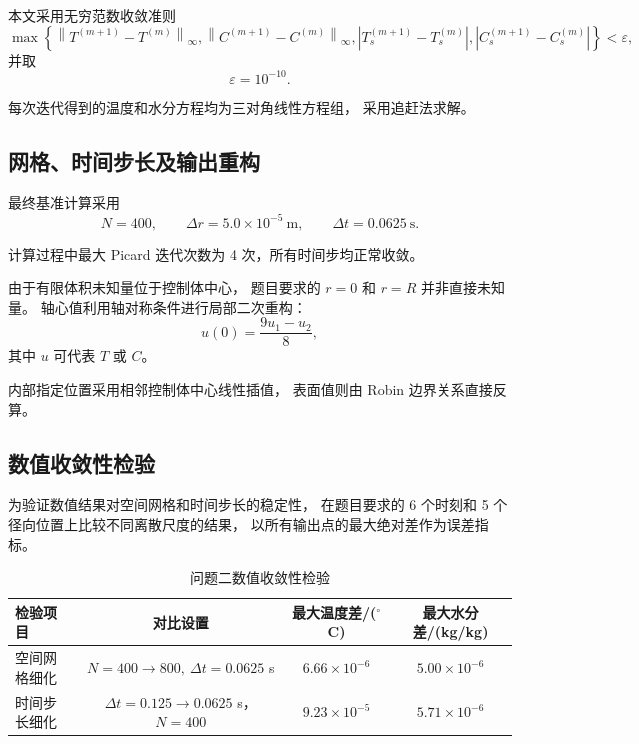 \documentclass[UTF8,a4paper,12pt]{ctexart}
\begin{document}
本文采用无穷范数收敛准则
\begin{equation}
\max
\left\{
\left\|T^{(m+1)}-T^{(m)}\right\|_{\infty},
\left\|C^{(m+1)}-C^{(m)}\right\|_{\infty},
|T_s^{(m+1)}-T_s^{(m)}|,
|C_s^{(m+1)}-C_s^{(m)}|
\right\}
<\varepsilon,
\end{equation}
并取
\begin{equation}
\varepsilon=10^{-10}.
\end{equation}

每次迭代得到的温度和水分方程均为三对角线性方程组，
采用追赶法求解。

\subsection{网格、时间步长及输出重构}

最终基准计算采用
\begin{equation}
N=400,\qquad
\Delta r=5.0\times10^{-5}~\mathrm{m},
\qquad
\Delta t=0.0625~\mathrm{s}.
\end{equation}

计算过程中最大 Picard 迭代次数为 4 次，所有时间步均正常收敛。

由于有限体积未知量位于控制体中心，
题目要求的 $r=0$ 和 $r=R$ 并非直接未知量。
轴心值利用轴对称条件进行局部二次重构：
\begin{equation}
u(0)
=
\frac{9u_1-u_2}{8},
\end{equation}
其中 $u$ 可代表 $T$ 或 $C$。

内部指定位置采用相邻控制体中心线性插值，
表面值则由 Robin 边界关系直接反算。

\subsection{数值收敛性检验}

为验证数值结果对空间网格和时间步长的稳定性，
在题目要求的 6 个时刻和 5 个径向位置上比较不同离散尺度的结果，
以所有输出点的最大绝对差作为误差指标。

\begin{table}[H]
\centering
\caption{问题二数值收敛性检验}
\begin{tabular}{lccc}
\toprule
检验项目 & 对比设置 & 最大温度差/($^\circ$C) & 最大水分差/(kg/kg)\\
\midrule
空间网格细化
& $N=400\rightarrow800,\ \Delta t=0.0625$ s
& $6.66\times10^{-6}$
& $5.00\times10^{-6}$\\
时间步长细化
& $\Delta t=0.125\rightarrow0.0625$ s，$N=400$
& $9.23\times10^{-5}$
& $5.71\times10^{-6}$\\
\bottomrule
\end{tabular}
\end{table}
\end{document}
